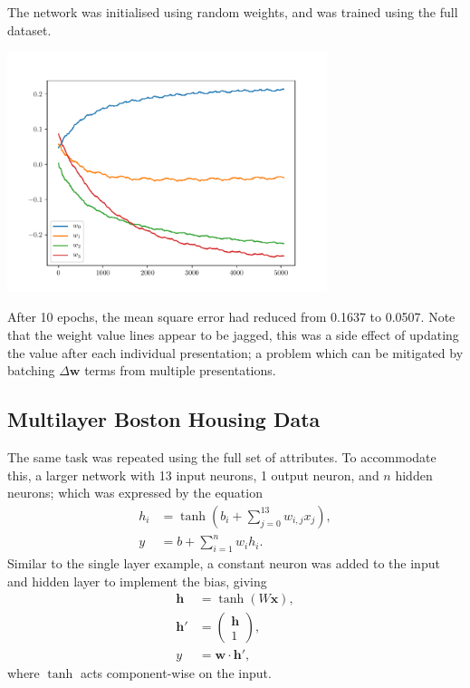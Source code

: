 The network was initialised using random weights, and was trained using the full
dataset.
\begin{center}
    \includegraphics[width=0.7\textwidth]{../Code/BostonHousingResult.pdf}
\end{center}
After 10 epochs, the mean square error had reduced from 0.1637 to 0.0507.
Note that the weight value lines appear to be jagged, this was a side effect of
updating the value after each individual presentation; a problem which can be
mitigated by batching $\Delta\mathbf{w}$ terms from multiple presentations.



\subsection{Multilayer Boston Housing Data}

The same task was repeated using the full set of attributes.
To accommodate this, a larger network with 13 input neurons, 1 output neuron,
and $n$ hidden neurons; which was expressed by the equation
\begin{align*}
    h_i &= \tanh\left(b_i + \sum_{j=0}^{13} w_{i,j}x_j\right),\\
    y &= b + \sum_{i=1}^{n} w_i h_i.
\end{align*}
Similar to the single layer example, a constant neuron was added to the input
and hidden layer to implement the bias, giving
\begin{align*}
    \mathbf{h} &= \tanh(W\mathbf{x}),\\
    \mathbf{h}' &= \begin{pmatrix} \mathbf{h} \\ 1 \end{pmatrix},\\
    y &= \mathbf{w}\cdot\mathbf{h}',
\end{align*}
where $\tanh$ acts component-wise on the input.

